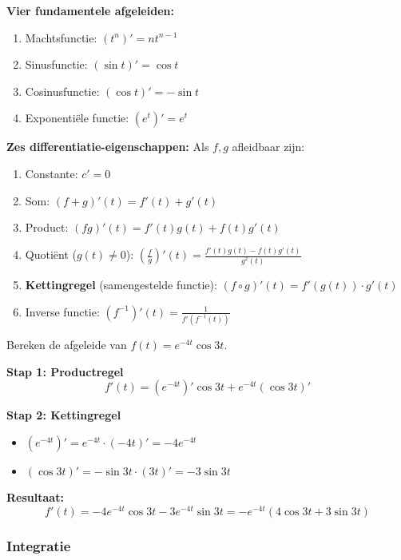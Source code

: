 \begin{theorie}
\textbf{Vier fundamentele afgeleiden:}
\begin{enumerate}
    \item Machtsfunctie: $(t^n)' = n t^{n-1}$
    \item Sinusfunctie: $(\sin t)' = \cos t$
    \item Cosinusfunctie: $(\cos t)' = -\sin t$
    \item Exponentiële functie: $(e^t)' = e^t$
\end{enumerate}

\textbf{Zes differentiatie-eigenschappen:}
Als $f, g$ afleidbaar zijn:
\begin{enumerate}
    \item Constante: $c' = 0$
    \item Som: $(f + g)'(t) = f'(t) + g'(t)$
    \item Product: $(f g)'(t) = f'(t)g(t) + f(t)g'(t)$
    \item Quotiënt ($g(t) \neq 0$): $\displaystyle \left(\frac{f}{g}\right)'(t) = \frac{f'(t)g(t) - f(t)g'(t)}{g^2(t)}$
    \item \textbf{Kettingregel} (samengestelde functie): $(f \circ g)'(t) = f'(g(t)) \cdot g'(t)$
    \item Inverse functie: $(f^{-1})'(t) = \frac{1}{f'(f^{-1}(t))}$
\end{enumerate}
\end{theorie}

\begin{voorbeeld}
Bereken de afgeleide van $f(t) = e^{-4t} \cos 3t$.

\textbf{Stap 1: Productregel}
\[ f'(t) = (e^{-4t})' \cos 3t + e^{-4t} (\cos 3t)' \]

\textbf{Stap 2: Kettingregel}
\begin{itemize}
    \item $(e^{-4t})' = e^{-4t} \cdot (-4t)' = -4e^{-4t}$
    \item $(\cos 3t)' = -\sin 3t \cdot (3t)' = -3\sin 3t$
\end{itemize}

\textbf{Resultaat:}
\[ f'(t) = -4e^{-4t} \cos 3t - 3e^{-4t} \sin 3t = -e^{-4t}(4\cos 3t + 3\sin 3t) \]
\end{voorbeeld}

\subsubsection{Integratie}

